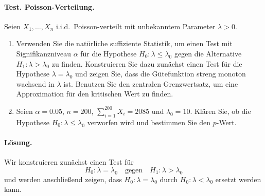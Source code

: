 \paragraph{Test. Poisson-Verteilung. }
Seien $X_1,\ldots,X_n$ i.i.d.\ Poisson-verteilt mit unbekanntem Parameter $\lambda>0$.
\begin{enumerate}
    \item Verwenden Sie die natürliche suffiziente Statistik, um einen Test mit Signifikanzniveau
         $\alpha$ für die Hypothese $H_0: \lambda\leq\lambda_0$ gegen die Alternative
         $H_1: \lambda>\lambda_0$ zu finden. Konstruieren Sie dazu zunächst einen Test für die
         Hypothese $\lambda=\lambda_0$ und zeigen Sie, dass die Gütefunktion streng monoton 
         wachsend in $\lambda$ ist. Benutzen Sie den zentralen Grenzwertsatz, um eine 
         Approximation für den kritischen Wert zu finden.
     \item Seien $\alpha=0.05$, $n=200$, $\sum_{i=1}^{200} X_i= 2085$ und $\lambda_0=10$. Klären
         Sie, ob die Hypothese $H_0: \lambda\leq\lambda_0$ verworfen wird und bestimmen Sie den 
         $p$-Wert.
\end{enumerate}

\paragraph*{Lösung.}
Wir konstruieren zunächst einen Test für 
\begin{equation}
    H_0 : \lambda=\lambda_0 \quad \textrm{gegen} \quad H_1 : \lambda>\lambda_0
\end{equation}
und werden anschließend zeigen, dass $H_0: \lambda=\lambda_0$ durch
$H_0: \lambda<\lambda_0$ ersetzt werden kann.

